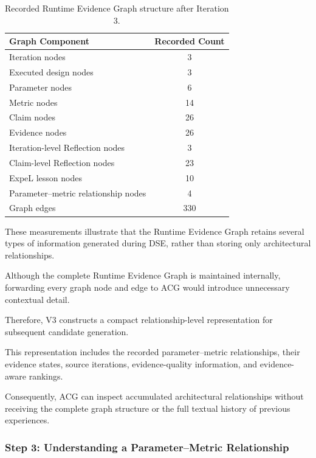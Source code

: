 \begin{table}[htbp]
\centering
\caption{Recorded Runtime Evidence Graph
structure after Iteration 3.}
\label{tab:app_v3_graph_snapshot}
\renewcommand{\arraystretch}{1.15}
\small
\begin{tabular}{lc}
\toprule
\textbf{Graph Component} &
\textbf{Recorded Count} \\
\midrule
Iteration nodes & 3 \\
Executed design nodes & 3 \\
Parameter nodes & 6 \\
Metric nodes & 14 \\
Claim nodes & 26 \\
Evidence nodes & 26 \\
Iteration-level Reflection nodes & 3 \\
Claim-level Reflection nodes & 23 \\
ExpeL lesson nodes & 10 \\
Parameter--metric relationship nodes & 4 \\
Graph edges & 330 \\
\bottomrule
\end{tabular}
\end{table}


These measurements illustrate that the
Runtime Evidence Graph retains several
types of information generated during DSE,
rather than storing only architectural
relationships.

Although the complete Runtime Evidence Graph
is maintained internally, forwarding every
graph node and edge to ACG would introduce
unnecessary contextual detail.

Therefore, V3 constructs a compact
relationship-level representation for
subsequent candidate generation.

This representation includes the recorded
parameter--metric relationships, their
evidence states, source iterations,
evidence-quality information, and
evidence-aware rankings.

Consequently, ACG can inspect accumulated
architectural relationships without
receiving the complete graph structure
or the full textual history of previous
experiences.




\subsubsection{Step 3: Understanding a Parameter--Metric Relationship}


